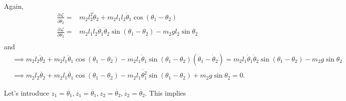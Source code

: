 \documentclass[11pt, leqno]{article}
\begin{document}
Again,
\begin{align*}
	\frac{\partial \mathcal{L}}{\partial \dot \theta_2} ={}& m_2l_2^2\dot \theta_2 + m_2l_1l_2\dot \theta_1\cos(\theta_1-\theta_2) \\
	\frac{\partial \mathcal{L}}{\partial \theta_2} ={}& m_2l_1l_2\dot \theta_1 \dot \theta_2 \sin(\theta_1-\theta_2) - m_2gl_2\sin\theta_2 \\
\end{align*}
and
\begin{align*}
	&\implies m_2l_2\ddot \theta_2 + m_2l_1\ddot \theta_1 \cos(\theta_1-\theta_2) -m_2l_1\dot \theta_1 \sin(\theta_1-\theta_2)(\dot \theta_1 - \dot \theta_2) = m_2l_1\dot \theta_1\dot \theta_2\sin(\theta_1-\theta_2) - m_2g\sin\theta_2\\
	&\implies m_2l_2 \ddot{\theta_2} + m_2l_1 \ddot{\theta_1}\cos(\theta_1-\theta_2)-m_2l_1 \dot{\theta_1^2}\sin(\theta_1-\theta_2) + m_2g\sin\theta_2 = 0
.\end{align*}

Let's introduce $z_1 = \dot{\theta_1}, \dot{z_1} = \ddot{\theta_1}, z_2= \dot{\theta_2}, \dot{z_2} = \ddot{\theta_2}$. This implies
\end{document}
